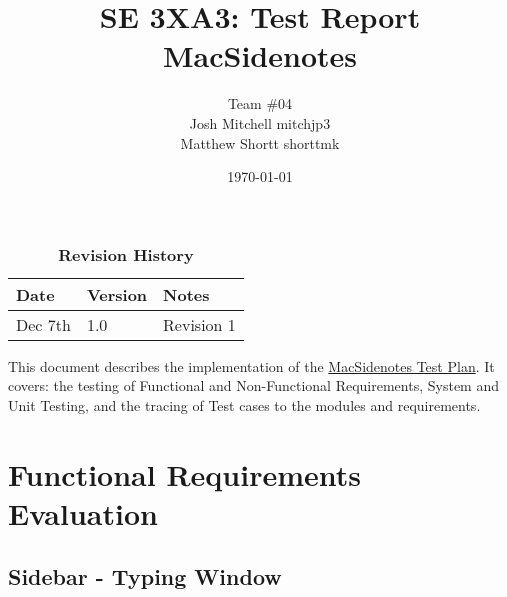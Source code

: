 \documentclass[12pt, titlepage]{article}
\title{SE 3XA3: Test Report\\MacSidenotes}
\author{Team \#04
		\\ Josh Mitchell mitchjp3
		\\ Matthew Shortt shorttmk
}
\date{\today}
\begin{document}
\maketitle
{}
\tableofcontents
\listoftables
\listoffigures

\begin{table}[h]
\caption{\bf Revision History}
\begin{tabularx}{\textwidth}{p{3cm}p{2cm}X}
\toprule {\bf Date} & {\bf Version} & {\bf Notes}\\
\midrule
Dec 7th & 1.0 & Revision 1\\
\bottomrule
\end{tabularx}
\end{table}

\newpage


This document describes the implementation of the 
\href{https://gitlab.cas.mcmaster.ca/macsidenotes/macsidenotes/blob/master/Doc/TestPlan/TestPlan.pdf}{MacSidenotes
 Test Plan}. It covers: the testing of Functional and Non-Functional 
 Requirements, System and Unit Testing, and the tracing of Test cases to the 
 modules and requirements.

\section{Functional Requirements Evaluation}
\subsection{Sidebar - Typing Window}
\end{document}
